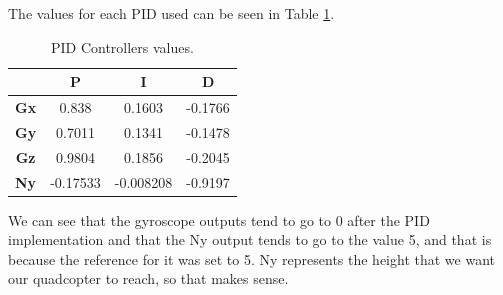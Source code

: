 The values for each PID used can be seen in Table \ref{PID}.

\begin{table}[H]
\centering
\begin{tabular}{|c|c|c|c|}
\hline
& \textbf{P} & \textbf{I}  & \textbf{D }\\ \hline
\textbf{Gx} & 0.838 & 0.1603 & -0.1766 \\ \hline
\textbf{Gy} & 0.7011 & 0.1341 & -0.1478 \\ \hline
\textbf{Gz} & 0.9804 & 0.1856 & -0.2045 \\ \hline
\textbf{Ny} & -0.17533 & -0.008208 & -0.9197 \\ \hline
\end{tabular}
\caption{PID Controllers values.}
\label{PID}
\end{table}

We can see that the gyroscope outputs tend to go to 0 after the PID implementation and that the Ny output tends to go to the value 5, and that is because the reference for it was set to 5. Ny represents the height that we want our quadcopter to reach, so that makes sense.
